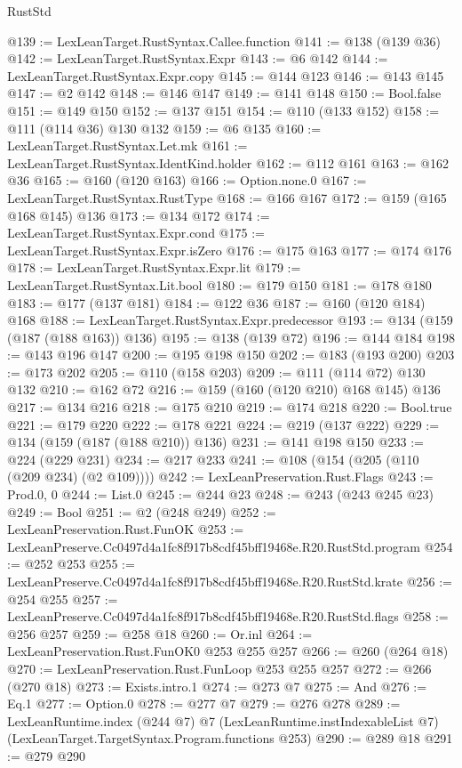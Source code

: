\begin{lexlean}{RustStd}
\begin{coremodule}
@139 := LexLeanTarget.RustSyntax.Callee.function
@141 := @138 (@139 @36)
@142 := LexLeanTarget.RustSyntax.Expr
@143 := @6 @142
@144 := LexLeanTarget.RustSyntax.Expr.copy
@145 := @144 @123
@146 := @143 @145
@147 := @2 @142
@148 := @146 @147
@149 := @141 @148
@150 := Bool.false
@151 := @149 @150
@152 := @137 @151
@154 := @110 (@133 @152)
@158 := @111 (@114 @36) @130 @132
@159 := @6 @135
@160 := LexLeanTarget.RustSyntax.Let.mk
@161 := LexLeanTarget.RustSyntax.IdentKind.holder
@162 := @112 @161
@163 := @162 @36
@165 := @160 (@120 @163)
@166 := Option.none.{0}
@167 := LexLeanTarget.RustSyntax.RustType
@168 := @166 @167
@172 := @159 (@165 @168 @145) @136
@173 := @134 @172
@174 := LexLeanTarget.RustSyntax.Expr.cond
@175 := LexLeanTarget.RustSyntax.Expr.isZero
@176 := @175 @163
@177 := @174 @176
@178 := LexLeanTarget.RustSyntax.Expr.lit
@179 := LexLeanTarget.RustSyntax.Lit.bool
@180 := @179 @150
@181 := @178 @180
@183 := @177 (@137 @181)
@184 := @122 @36
@187 := @160 (@120 @184) @168
@188 := LexLeanTarget.RustSyntax.Expr.predecessor
@193 := @134 (@159 (@187 (@188 @163)) @136)
@195 := @138 (@139 @72)
@196 := @144 @184
@198 := @143 @196 @147
@200 := @195 @198 @150
@202 := @183 (@193 @200)
@203 := @173 @202
@205 := @110 (@158 @203)
@209 := @111 (@114 @72) @130 @132
@210 := @162 @72
@216 := @159 (@160 (@120 @210) @168 @145) @136
@217 := @134 @216
@218 := @175 @210
@219 := @174 @218
@220 := Bool.true
@221 := @179 @220
@222 := @178 @221
@224 := @219 (@137 @222)
@229 := @134 (@159 (@187 (@188 @210)) @136)
@231 := @141 @198 @150
@233 := @224 (@229 @231)
@234 := @217 @233
@241 := @108 (@154 (@205 (@110 (@209 @234) (@2 @109))))
@242 := LexLeanPreservation.Rust.Flags
@243 := Prod.{0, 0}
@244 := List.{0}
@245 := @244 @23
@248 := @243 (@243 @245 @23)
@249 := Bool
@251 := @2 (@248 @249)
@252 := LexLeanPreservation.Rust.FunOK
@253 := LexLeanPreserve.Cc0497d4a1fc8f917b8cdf45bff19468e.R20.RustStd.program
@254 := @252 @253
@255 := LexLeanPreserve.Cc0497d4a1fc8f917b8cdf45bff19468e.R20.RustStd.krate
@256 := @254 @255
@257 := LexLeanPreserve.Cc0497d4a1fc8f917b8cdf45bff19468e.R20.RustStd.flags
@258 := @256 @257
@259 := @258 @18
@260 := Or.inl
@264 := LexLeanPreservation.Rust.FunOK0 @253 @255 @257
@266 := @260 (@264 @18)
@270 := LexLeanPreservation.Rust.FunLoop @253 @255 @257
@272 := @266 (@270 @18)
@273 := Exists.intro.{1}
@274 := @273 @7
@275 := And
@276 := Eq.{1}
@277 := Option.{0}
@278 := @277 @7
@279 := @276 @278
@289 := LexLeanRuntime.index
    (@244 @7)
    @7
    (LexLeanRuntime.instIndexableList @7)
    (LexLeanTarget.TargetSyntax.Program.functions @253)
@290 := @289 @18
@291 := @279 @290

\end{coremodule}
\end{lexlean}
